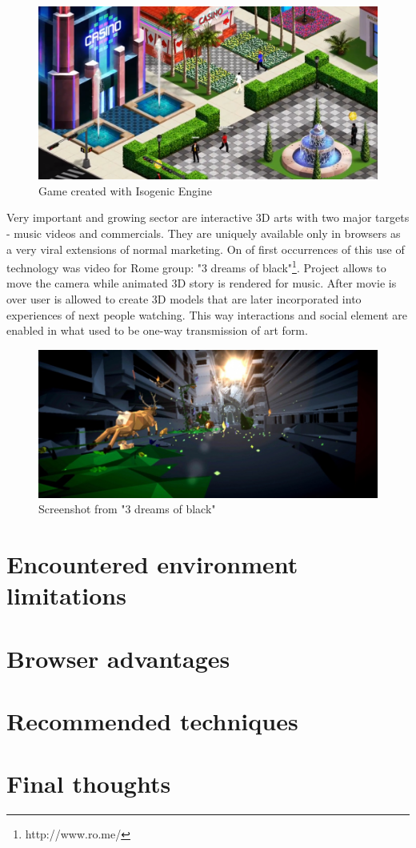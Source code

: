 \begin{figure}[h!]
  \caption{Game created with Isogenic Engine}
  \label{img:isogenic}
  \centering
	\includegraphics[width=12cm]{summary/isogenic.png}
\end{figure}

Very important and growing sector are interactive 3D arts with two major targets - music videos and commercials. They are uniquely available only in browsers as a very viral extensions of normal marketing. On of first occurrences of this use of technology was video for Rome group: "3 dreams of black"\footnote{http://www.ro.me/}. Project allows to move the camera while animated 3D story is rendered for music. After movie is over user is allowed to create 3D models that are later incorporated into experiences of next people watching. This way interactions and social element are enabled in what used to be one-way transmission of art form. 

\begin{figure}[h!]
  \caption{Screenshot from "3 dreams of black"}
  \label{img:rome}
  \centering
	\includegraphics[width=12cm]{summary/rome.jpg}
\end{figure}

\section{Encountered environment limitations}
\label{sec:limitations}

\section{Browser advantages}
\label{sec:advantages}

\section{Recommended techniques}
\label{sec:recommended}

\section{Final thoughts}
\label{sec:final} 
